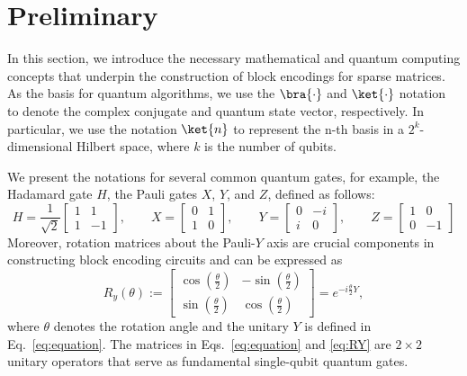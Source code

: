 \documentclass{article}
\begin{document}
\section{Preliminary}\label{sec:preliminary}
In this section, we introduce the necessary mathematical and quantum computing concepts that underpin the construction of block encodings for sparse matrices.
As the basis for quantum algorithms, we use the $\bra{\cdot}$ and $\ket{\cdot}$ notation to denote the complex conjugate and quantum state vector, respectively. In particular, we use the notation $\ket{n}$ to represent the n-th basis in a $2^k$-dimensional Hilbert space, where $k$ is the number of qubits.

We present the notations for several common quantum gates, for example, the Hadamard gate $H$, the Pauli gates $X$, $Y$, and $Z$, defined as follows:
\begin{equation}
  H = \frac{1}{\sqrt{2}}
  \begin{bmatrix}
    1 & 1  \\
    1 & -1
  \end{bmatrix}, \qquad
  X =
  \begin{bmatrix}
    0 & 1 \\
    1 & 0
  \end{bmatrix}, \qquad
  Y =
  \begin{bmatrix}
    0 & -i \\
    i & 0
  \end{bmatrix}, \qquad
  Z =
  \begin{bmatrix}
    1 & 0  \\
    0 & -1
  \end{bmatrix}\label{eq:equation}
\end{equation}
Moreover, rotation matrices about the Pauli-$Y$ axis are crucial components in constructing block encoding circuits and can be expressed as
\begin{equation}
  R_y(\theta) :=
  \begin{bmatrix}
    \cos\left(\frac{\theta}{2}\right) & -\sin\left(\frac{\theta}{2}\right) \\
    \sin\left(\frac{\theta}{2}\right) & \cos\left(\frac{\theta}{2}\right)
  \end{bmatrix}
  = e^{-i \frac{\theta}{2} Y}, \tag{2.2} \label{eq:RY}
\end{equation}
where $\theta$ denotes the rotation angle and the unitary $Y$ is defined in Eq.~\eqref{eq:equation}. The matrices in Eqs.~\eqref{eq:equation} and \eqref{eq:RY} are $2 \times 2$ unitary operators that serve as fundamental single-qubit quantum gates.
\end{document}
